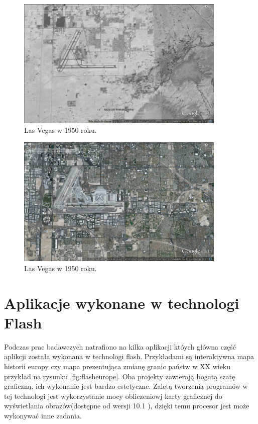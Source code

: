 \begin{figure}[H]
  \centering
    \includegraphics[width=100mm]{ge/02_1977.jpg}
  \caption{Las Vegas w 1950 roku.}
  \label{fig:lasVegas2}
\end{figure}

\begin{figure}[H]
  \centering
    \includegraphics[width=100mm]{ge/03_2012.jpg}
  \caption{Las Vegas w 1950 roku.}
  \label{fig:lasVegas3}
\end{figure}

\section{Aplikacje wykonane w technologi Flash}
\label{sec:flashmap}

Podczas prac badawczych natrafiono na kilka aplikacji któych główna część aplikcji została wykonana w technologi flash. Przykładami są interaktywna mapa historii europy \cite{worldology} czy mapa prezentująca zmianę granic państw w XX wieku \cite{flashborder} przykład na rysunku \ref{fig:flasheurope}. Oba projekty zawierają bogatą szatę graficzną, ich wykonanie jest bardzo estetyczne.
Zaletą tworzenia programów w tej technologi jest wykorzystanie mocy obliczeniowj karty graficznej do wyświetlania obrazów(dostępne od wersji 10.1 \cite{flashfrapghic}), dzięki temu procesor jest może wykonywać inne zadania.


